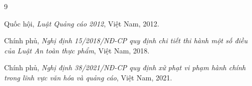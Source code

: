 \begin{thebibliography}{9}

Quốc hội, \textit{Luật Quảng cáo 2012}, Việt Nam, 2012.

Chính phủ, \textit{Nghị định 15/2018/NĐ-CP quy định chi tiết thi hành một số điều của Luật An toàn thực phẩm}, Việt Nam, 2018.

Chính phủ, \textit{Nghị định 38/2021/NĐ-CP quy định xử phạt vi phạm hành chính trong lĩnh vực văn hóa và quảng cáo}, Việt Nam, 2021.

\end{thebibliography}
